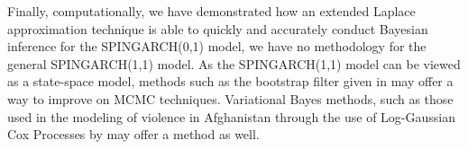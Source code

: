 \documentclass[11pt]{isuthesis}
\begin{document}
	Finally, computationally, we have demonstrated how an extended Laplace approximation technique is able to quickly and accurately conduct Bayesian inference for the SPINGARCH(0,1) model, we have no methodology for the general SPINGARCH(1,1) model.  As the SPINGARCH(1,1) model can be viewed as a state-space model, methods such as the bootstrap filter given in \cite{doucet_de_freitas_gordon_2010} may offer a way to improve on MCMC techniques.  Variational Bayes methods, such as those used in the modeling of violence in Afghanistan through the use of Log-Gaussian Cox Processes by \cite{zammit2013modeling} may offer a method as well.







%
%
%
%

\renewcommand{\bibname}{\centerline{BIBLIOGRAPHY}}
\unappendixtitle
\newpage
{}
{}

\end{document}
